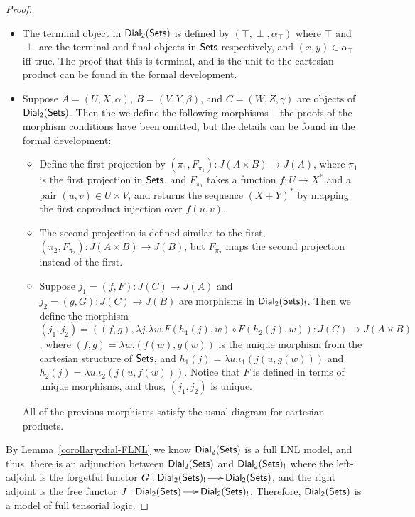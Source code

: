 \begin{proof}
\begin{itemize}
  \item The terminal object in $\mathsf{Dial_2}(\mathsf{Sets})$ is defined by $(\top, \perp,
    \alpha_\top)$ where $\top$ and $\perp$ are the terminal and final
    objects in $\mathsf{Sets}$ respectively, and $(x , y) \in \alpha_\top$ iff
    true. The proof that this is terminal, and is the unit to the
    cartesian product can be found in the formal development.
    
  \item Suppose $A = (U , X , \alpha)$, $B = (V , Y , \beta)$, and $C
    = (W , Z , \gamma)$ are objects of $\mathsf{Dial_2}(\mathsf{Sets})$.  Then the we define
    the following morphisms -- the proofs of the morphism conditions
    have been omitted, but the details can be found in the formal
    development:
    \begin{itemize}
    \item Define the first projection by $(\pi_1, F_{\pi_1}) : J(A
      \times B) \to J(A)$, where $\pi_1$ is the first projection in
      $\mathsf{Sets}$, and $F_{\pi_1}$ takes a function $f : U \to X^*$ and a
      pair $(u , v) \in U \times V$, and returns the sequence $(X +
      Y)^*$ by mapping the first coproduct injection over $f(u ,v)$.

    \item The second projection is defined similar to the first,
      $(\pi_2, F_{\pi_2}) : J(A \times B) \to J(B)$, but $F_{\pi_2}$ maps
      the second projection instead of the first.

    \item Suppose $j_1 = (f , F) : J(C) \to J(A)$ and $j_2 = (g , G) : J(C) \to
      J(B)$ are morphisms in $\mathsf{Dial_2}(\mathsf{Sets})_!$.  Then we define the morphism
      $(j_1, j_2) = ((f,g),\lambda j.\lambda w.F(h_1(j),w) \circ F(h_2(j),w))
      : J(C) \to J(A \times B)$, where $(f,g) = \lambda w.(f(w),g(w))$ is the unique morphism
      from the cartesian structure of $\mathsf{Sets}$, and
      $h_1(j) = \lambda u.\iota_1(j(u,g(w)))$ and
      $h_2(j) = \lambda u.\iota_2(j(u,f(w)))$.
      Notice that $F$ is defined in terms of unique morphisms, and thus,
      $(j_1,j_2)$ is unique.
    \end{itemize}
    All of the previous morphisms satisfy the usual diagram for
    cartesian products.    
  \end{itemize}

  By Lemma~\ref{corollary:dial-FLNL} we know $\mathsf{Dial_2}(\mathsf{Sets})$ is a full LNL
  model, and thus, there is an adjunction between $\mathsf{Dial_2}(\mathsf{Sets})$ and
  $\mathsf{Dial_2}(\mathsf{Sets})_!$ where the left-adjoint is the forgetful functor $G :
  \mathsf{Dial_2}(\mathsf{Sets})_! \to \mathsf{Dial_2}(\mathsf{Sets})$, and the right adjoint is the free functor $J :
  \mathsf{Dial_2}(\mathsf{Sets}) \to \mathsf{Dial_2}(\mathsf{Sets})_!$.  Therefore, $\mathsf{Dial_2}(\mathsf{Sets})$ is a model of full tensorial
  logic.
\end{proof}

